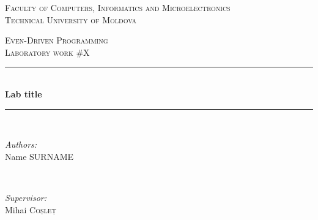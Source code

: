 \begin{titlepage}

  \begin{center} %

  \textsc{\large Faculty of Computers, Informatics and Microelectronics}\\[0.5cm]
  \textsc{\large Technical University of Moldova}\\[1.2cm] %
  \vspace{25 mm}

  \textsc{\Large Even-Driven Programming}\\[0.5cm] %
  \textsc{\large Laboratory work \#X}\\[0.5cm] %

\newcommand{\HRule}{\rule{\linewidth}{0.5mm}} %

  \vspace{10 mm}
  \HRule \\[0.4cm]
  { \LARGE \bfseries Lab title  }\\[0.4cm] %
  \HRule \\[1.5cm]

      \vspace{30mm}

      \begin{minipage}{0.4\textwidth}
      \begin{flushleft} \large
      \emph{Authors:}\\
      Name \textsc{SURNAME}
      \end{flushleft}
      \end{minipage}
      ~
      \begin{minipage}{0.4\textwidth}
      \begin{flushright} \large
      \emph{Supervisor:} \\
      Mihai \textsc{Coșleț} %
      \end{flushright}
      \end{minipage}\\[4cm]


\end{center}
\end{titlepage}
